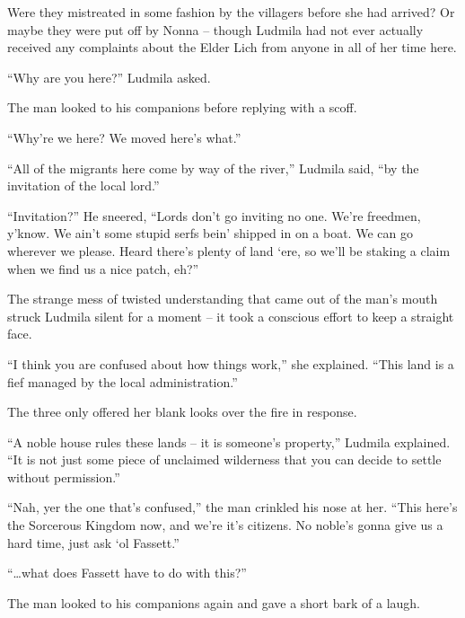  

Were they mistreated in some fashion by the villagers before she had arrived? Or maybe they were put off by Nonna – though Ludmila had not ever actually received any complaints about the Elder Lich from anyone in all of her time here.

 

“Why are you here?” Ludmila asked.

 

The man looked to his companions before replying with a scoff.

 

“Why’re we here? We moved here’s what.”

 

“All of the migrants here come by way of the river,” Ludmila said, “by the invitation of the local lord.”

 

“Invitation?” He sneered, “Lords don’t go inviting no one. We’re freedmen, y’know. We ain’t some stupid serfs bein’ shipped in on a boat. We can go wherever we please. Heard there’s plenty of land ‘ere, so we’ll be staking a claim when we find us a nice patch, eh?”

 

The strange mess of twisted understanding that came out of the man’s mouth struck Ludmila silent for a moment – it took a conscious effort to keep a straight face.

 

“I think you are confused about how things work,” she explained. “This land is a fief managed by the local administration.”

 

The three only offered her blank looks over the fire in response.

 

“A noble house rules these lands – it is someone’s property,” Ludmila explained. “It is not just some piece of unclaimed wilderness that you can decide to settle without permission.”

 

“Nah, yer the one that’s confused,” the man crinkled his nose at her. “This here’s the Sorcerous Kingdom now, and we’re it’s citizens. No noble’s gonna give us a hard time, just ask ‘ol Fassett.”

 

“…what does Fassett have to do with this?”

 

The man looked to his companions again and gave a short bark of a laugh.


